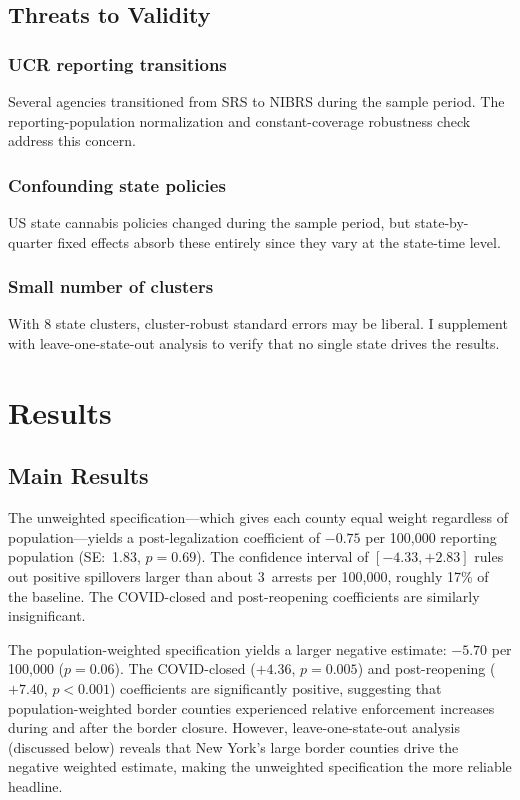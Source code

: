 \documentclass[12pt]{article}
\begin{document}
\subsection{Threats to Validity}

\subsubsection*{UCR reporting transitions} Several agencies transitioned from SRS to NIBRS during the sample period. The reporting-population normalization and constant-coverage robustness check address this concern.

\subsubsection*{Confounding state policies} US state cannabis policies changed during the sample period, but state-by-quarter fixed effects absorb these entirely since they vary at the state-time level.

\subsubsection*{Small number of clusters} With 8 state clusters, cluster-robust standard errors may be liberal. I supplement with leave-one-state-out analysis to verify that no single state drives the results.


\section{Results}
\label{sec:results}

\subsection{Main Results}



The unweighted specification---which gives each county equal weight regardless of population---yields a post-legalization coefficient of $-0.75$ per 100,000 reporting population (SE:~1.83, $p = 0.69$). The confidence interval of $[-4.33, +2.83]$ rules out positive spillovers larger than about 3~arrests per 100,000, roughly 17\% of the baseline. The COVID-closed and post-reopening coefficients are similarly insignificant.

The population-weighted specification yields a larger negative estimate: $-5.70$ per 100,000 ($p = 0.06$). The COVID-closed ($+4.36$, $p = 0.005$) and post-reopening ($+7.40$, $p < 0.001$) coefficients are significantly positive, suggesting that population-weighted border counties experienced relative enforcement increases during and after the border closure. However, leave-one-state-out analysis (discussed below) reveals that New York's large border counties drive the negative weighted estimate, making the unweighted specification the more reliable headline.
\end{document}
